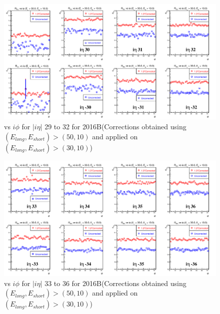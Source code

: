\clearpage
\begin{figure}[h!]
\centering
\includegraphics[width=0.99\linewidth]{../Figures/Chap2/ImageFiles_HF/Ratio/2016/Corrected/EnegyCut3010/ieta29_32_E1E2Cut1Ietaiphi_Crrtd}
\caption{\ratiosl vs $i\phi$ for $|i\eta|$ 29 to 32 for 2016B(Corrections obtained using $(E_{long},E_{short})>(50,10)$ and applied on $(E_{long},E_{short})>(30,10)$)}
\label{fig:ieta29_32_E1E2Cut1Ietaiphi_Crrtd}
\end{figure}
\begin{figure}[h!]
\centering
\includegraphics[width=0.99\linewidth]{../Figures/Chap2/ImageFiles_HF/Ratio/2016/Corrected/EnegyCut3010/ieta33_36_E1E2Cut1Ietaiphi_Crrtd}
\caption{\ratiosl vs $i\phi$ for $|i\eta|$ 33 to 36 for 2016B(Corrections obtained using $(E_{long},E_{short})>(50,10)$ and applied on $(E_{long},E_{short})>(30,10)$)}
\label{fig:ieta33_36_E1E2Cut1Ietaiphi_Crrtd}
\end{figure}
